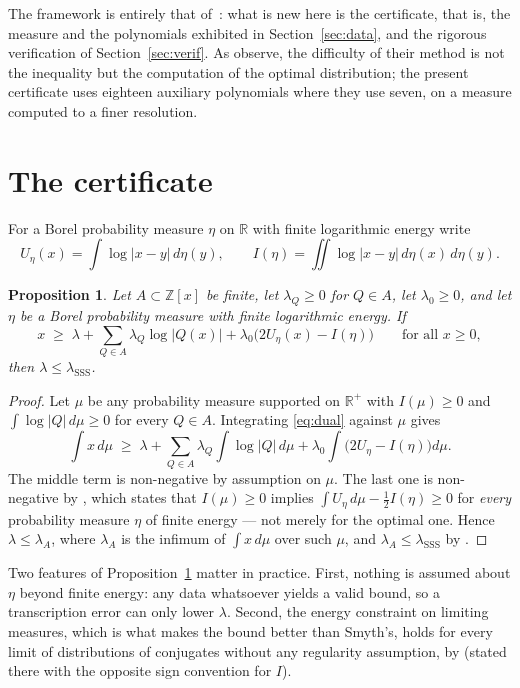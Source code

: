 \documentclass[11pt,a4paper]{article}
\newtheorem{proposition}[theorem]{Proposition}
\newcommand{\lsss}{\lambda_{\mathrm{SSS}}}
\begin{document}
The framework is entirely that of~\cite{OTS}: what is new here is the
certificate, that is, the measure and the polynomials exhibited in
Section~\ref{sec:data}, and the rigorous verification of
Section~\ref{sec:verif}. As \cite{OTS} observe, the difficulty of their method
is not the inequality but the computation of the optimal distribution; the
present certificate uses eighteen auxiliary polynomials where they use seven,
on a measure computed to a finer resolution.

\section{The certificate}\label{sec:cert}

For a Borel probability measure $\eta$ on $\mathbb{R}$ with finite logarithmic
energy write
\[
  U_\eta(x)=\int\log|x-y|\,d\eta(y),\qquad
  I(\eta)=\iint\log|x-y|\,d\eta(x)\,d\eta(y).
\]

\begin{proposition}\label{prop:cert}
Let $A\subset\mathbb{Z}[x]$ be finite, let $\lambda_Q\ge 0$ for $Q\in A$, let
$\lambda_0\ge 0$, and let $\eta$ be a Borel probability measure with finite
logarithmic energy. If
\begin{equation}\label{eq:dual}
  x \;\ge\; \lambda+\sum_{Q\in A}\lambda_Q\log|Q(x)|
            +\lambda_0\bigl(2U_\eta(x)-I(\eta)\bigr)
  \qquad\text{for all } x\ge 0,
\end{equation}
then $\lambda\le\lsss$.
\end{proposition}

\begin{proof}
Let $\mu$ be any probability measure supported on $\mathbb{R}^{+}$ with
$I(\mu)\ge 0$ and $\int\log|Q|\,d\mu\ge 0$ for every $Q\in A$. Integrating
\eqref{eq:dual} against $\mu$ gives
\[
  \int x\,d\mu \;\ge\; \lambda
  +\sum_{Q\in A}\lambda_Q\int\log|Q|\,d\mu
  +\lambda_0\int\bigl(2U_\eta-I(\eta)\bigr)d\mu .
\]
The middle term is non-negative by assumption on $\mu$. The last one is
non-negative by \cite[Lemma 2.4]{OTS}, which states that $I(\mu)\ge 0$ implies
$\int U_\eta\,d\mu-\tfrac12 I(\eta)\ge 0$ for \emph{every} probability measure
$\eta$ of finite energy --- not merely for the optimal one. Hence
$\lambda\le\lambda_A$, where $\lambda_A$ is the infimum of $\int x\,d\mu$ over
such $\mu$, and $\lambda_A\le\lsss$ by \cite[Corollary 1.2]{OTS}.
\end{proof}

Two features of Proposition~\ref{prop:cert} matter in practice. First, nothing
is assumed about $\eta$ beyond finite energy: any data whatsoever yields a valid
bound, so a transcription error can only lower $\lambda$. Second, the energy
constraint on limiting measures, which is what makes the bound better than
Smyth's, holds for every limit of distributions of conjugates without any
regularity assumption, by \cite[Proposition 5.7]{Smi} (stated there with the
opposite sign convention for $I$).
\end{document}
